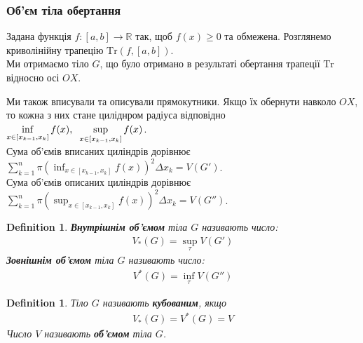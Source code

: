 \documentclass[a4paper, 10pt]{article}
\def\huge{\displaystyle}
\theoremstyle{theoremdd}
\theoremstyle{theoremdd}
\theoremstyle{theoremdd}
\newtheorem{definition}[theorem]{Definition}
\theoremstyle{theoremdd}
\theoremstyle{theoremdd}
\theoremstyle{theoremdd}
\theoremstyle{theoremdd}
\theoremstyle{theoremdd}
\theoremstyle{theoremdd}
\begin{document}
\subsubsection{Об'єм тіла обертання}
Задана функція $f \colon [a,b] \to \mathbb{R}$ так, щоб $f(x) \geq 0$ та обмежена. Розглянемо криволінійну трапецію $\text{Tr}(f,[a,b])$.\\
Ми отримаємо тіло $G$, що було отримано в результаті обертання трапеції $\text{Tr}$ відносно осі $OX$.
\begin{figure}[H]
\centering
{}
\qquad
{}
\end{figure}
Ми також вписували та описували прямокутники. Якщо їх обернути навколо $OX$, то кожна з них стане циліднром радіуса відповідно $\huge\inf_{x \in [x_{k-1},x_k]} f(x), \hspace{0.2cm} \huge\sup_{x \in [x_{k-1},x_k]} f(x)$.\\
Сума об'ємів вписаних циліндрів дорівнює $\huge\sum_{k=1}^n \pi \left( \huge\inf_{x \in [x_{k-1},x_k]} f(x) \right)^2 \Delta x_k = V(G')$.\\
Сума об'ємів описаних циліндрів дорівнює $\huge\sum_{k=1}^n \pi \left( \huge\sup_{x \in [x_{k-1},x_k]} f(x) \right)^2 \Delta x_k = V(G'')$.

\begin{definition}
\textbf{Внутрішнім об'ємом} тіла $G$ називають число:
\begin{align*}
V_*(G) = \huge\sup_{\tau} V(G')
\end{align*}
\textbf{Зовнішнім об'ємом} тіла $G$ називають число:
\begin{align*}
V^*(G) = \huge\inf_{\tau} V(G'')
\end{align*}
\end{definition}

\begin{definition}
Тіло $G$ називають \textbf{кубованим}, якщо
\begin{align*}
V_*(G) = V^*(G) = V
\end{align*}
Число $V$ називають \textbf{об'ємом} тіла $G$.
\end{definition}
\end{document}
